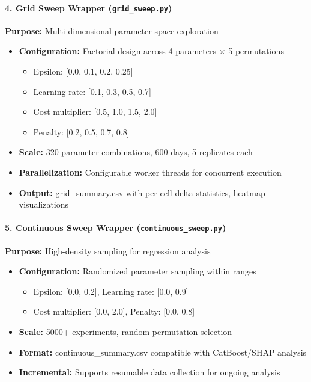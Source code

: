 \documentclass[aps,pre,twocolumn,floatfix,nofootinbib,amsmath,amssymb]{revtex4-2}
\begin{document}
\paragraph{4. Grid Sweep Wrapper (\texttt{grid\_sweep.py})}
\textbf{Purpose:} Multi-dimensional parameter space exploration
\begin{itemize}
\item \textbf{Configuration:} Factorial design across 4 parameters $\times$ 5 permutations
    \begin{itemize}
    \item Epsilon: [0.0, 0.1, 0.2, 0.25]
    \item Learning rate: [0.1, 0.3, 0.5, 0.7]
    \item Cost multiplier: [0.5, 1.0, 1.5, 2.0]
    \item Penalty: [0.2, 0.5, 0.7, 0.8]
    \end{itemize}
\item \textbf{Scale:} 320 parameter combinations, 600 days, 5 replicates each
\item \textbf{Parallelization:} Configurable worker threads for concurrent execution
\item \textbf{Output:} grid\_summary.csv with per-cell delta statistics, heatmap visualizations
\end{itemize}

\paragraph{5. Continuous Sweep Wrapper (\texttt{continuous\_sweep.py})}
\textbf{Purpose:} High-density sampling for regression analysis
\begin{itemize}
\item \textbf{Configuration:} Randomized parameter sampling within ranges
    \begin{itemize}
    \item Epsilon: [0.0, 0.2], Learning rate: [0.0, 0.9]
    \item Cost multiplier: [0.0, 2.0], Penalty: [0.0, 0.8]
    \end{itemize}
\item \textbf{Scale:} 5000+ experiments, random permutation selection
\item \textbf{Format:} continuous\_summary.csv compatible with CatBoost/SHAP analysis
\item \textbf{Incremental:} Supports resumable data collection for ongoing analysis
\end{itemize}
\end{document}

